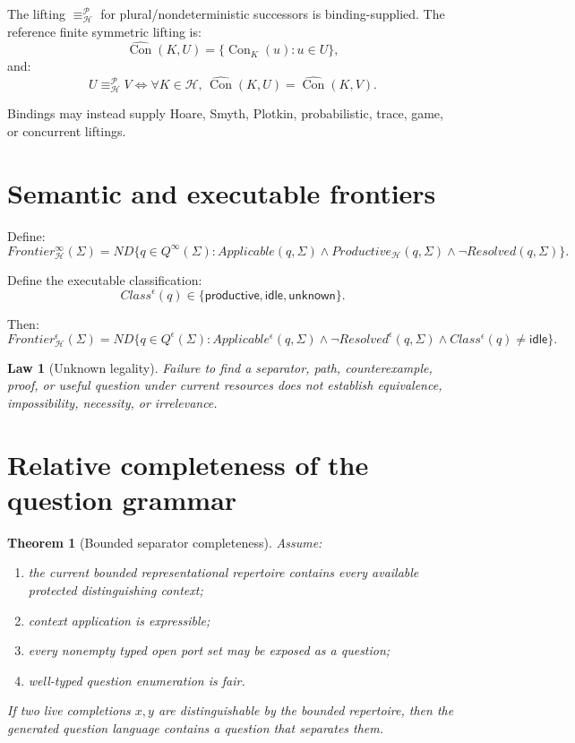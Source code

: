 \documentclass[11pt,oneside]{article}
\newtheorem{law}[definition]{Law}
\newtheorem{theorem}[definition]{Theorem}
\newcommand{\Con}{\operatorname{Con}}
\begin{document}
The lifting \(\equiv_{\mathcal H}^{\mathcal P}\) for plural/nondeterministic successors is binding-supplied.  The reference finite symmetric lifting is:
\[
\widehat{\Con}(K,U)
=
\{\Con_K(u):u\in U\},
\]
and:
\[
U\equiv_{\mathcal H}^{\mathcal P}V
\iff
\forall K\in\mathcal H,\,
\widehat{\Con}(K,U)=\widehat{\Con}(K,V).
\]

Bindings may instead supply Hoare, Smyth, Plotkin, probabilistic, trace, game, or concurrent liftings.

\section{Semantic and executable frontiers}

Define:
\[
\boxed{
Frontier^\infty_{\mathcal H}(\Sigma)
=
ND\{
q\in Q^\infty(\Sigma):
Applicable(q,\Sigma)
\land
Productive_{\mathcal H}(q,\Sigma)
\land
\neg Resolved(q,\Sigma)
\}.
}
\]

Define the executable classification:
\[
Class^\epsilon(q)
\in
\{
\mathsf{productive},
\mathsf{idle},
\mathsf{unknown}
\}.
\]

Then:
\[
\boxed{
Frontier^\epsilon_{\mathcal H}(\Sigma)
=
ND\{
q\in Q^\epsilon(\Sigma):
Applicable^\epsilon(q,\Sigma)
\land
\neg Resolved^\epsilon(q,\Sigma)
\land
Class^\epsilon(q)\neq\mathsf{idle}
\}.
}
\]

\begin{law}[Unknown legality]
Failure to find a separator, path, counterexample, proof, or useful question under current resources does not establish equivalence, impossibility, necessity, or irrelevance.
\end{law}

\section{Relative completeness of the question grammar}

\begin{theorem}[Bounded separator completeness]
Assume:
\begin{enumerate}
\item the current bounded representational repertoire contains every available protected distinguishing context;
\item context application is expressible;
\item every nonempty typed open port set may be exposed as a question;
\item well-typed question enumeration is fair.
\end{enumerate}
If two live completions \(x,y\) are distinguishable by the bounded repertoire, then the generated question language contains a question that separates them.
\end{theorem}
\end{document}
